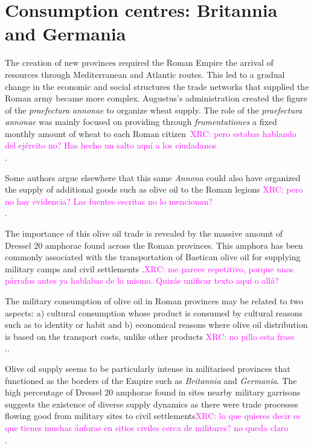 \documentclass[review]{elsarticle}
\newcommand{\memo}[2]{\textcolor{#1}{#2}}
\newcommand{\xavi}[1]{\memo{magenta}{XRC: #1\\}}
\begin{document}
\section{Consumption centres: Britannia and Germania}


The creation of new provinces required the Roman Empire the arrival of resources through Mediterranean and Atlantic routes.
This led to a gradual change in the economic and social structures the trade networks that supplied the Roman army became more complex. Augustus's administration created the figure of the \textit{praefectura annonae} to organize wheat supply. The role of the \textit{praefectura annonae} was mainly focused on providing through \textit{frumentationes} a fixed monthly amount of wheat to each Roman citizen~\citep{remesal_annona_1986,remesal_concierto}\xavi{pero estabas hablando del ejército no? Has hecho un salto aquí a los ciudadanos}. 

Some authors argue elsewhere that this same \textit{Annona} could also have organized the supply of additional goods such as olive oil to the Roman legions \citep{remesal_annona_1986,remesal_annona_1990}\xavi{pero no hay evidencia? Las fuentes escritas no lo mencionan?}.

The importance of this olive oil trade is revealed by the massive amount of Dressel 20 amphorae found across the Roman provinces. This amphora has been commonly associated with the transportation of Baetican olive oil for supplying military camps and civil settlements \citep{berni_millet_epigrafianforica_2008}.\xavi{me parece repetitivo, porque unos párrafos antes ya hablabas de lo mismo. Quizás unificar texto aquí o allá?}
 
The military consumption of olive oil in Roman provinces may be related to two aspects: a) cultural consumption whose product is consumed by cultural reasons such as to identity or habit and b) economical reasons where olive oil distribution is based on the transport costs, unlike other products \citep[69-70]{carreras_britannia_1998}\xavi{no pillo esta frase}.. 

Olive oil supply seems to be particularly intense in militarised provinces that functioned as the borders of the Empire such as \textit{Britannia} and \textit{Germania}. The high percentage of Dressel 20 amphorae found in sites nearby military garrisons suggests the existence of diverse supply dynamics as there were trade processes flowing good from military sites to civil settlements\citep{remesal_annona_1986, carreras_britannia_1998}\xavi{lo que quieres decir es que tienes muchas ánforas en sitios civiles cerca de militares? no queda claro}.
\end{document}
